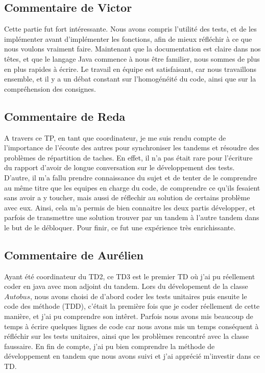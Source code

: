 \documentclass[a4paper,11pts]{article}
\begin{document}
\subsection{Commentaire de Victor}
Cette partie fut fort intéressante. Nous avons compris l'utilité des tests, et de les implémenter avant d'implémenter les fonctions, afin de mieux réfléchir à ce que nous voulons vraiment faire. Maintenant que la documentation est claire dans nos têtes, et que le langage Java commence à nous être familier, nous sommes de plus en plus rapides à écrire. Le travail en équipe est satisfaisant, car nous travaillons ensemble, et il y a un débat constant sur l'homogénéité du code, ainsi que sur la compréhension des consignes.


\subsection{Commentaire de Reda}
A travers ce TP, en tant que coordinateur, je me suis rendu compte de l'importance de l'écoute des autres pour synchroniser les tandems et résoudre des problèmes de répartition de taches. En effet, il n'a pas était rare pour l'écriture du rapport d'avoir de longue conversation sur le développement des tests. D'autre, il m'a fallu prendre connaissance du sujet et de tenter de le comprendre au m\^eme titre que les equipes en charge du code, de comprendre ce qu'ils fesaient sans avoir a y toucher, mais aussi de réflechir au solution de certains problème avec eux. Ainsi, cela m'a permis de bien connaitre les deux partis développer, et parfois de transmettre une solution trouver par un tandem à l'autre tandem dans le but de le débloquer. Pour finir, ce fut une expérience très enrichissante.     



\subsection{Commentaire de Aurélien}

Ayant été coordinateur du TD2, ce TD3 est le premier TD où j'ai pu réellement coder en java avec mon adjoint du tandem. Lors du dévelopement de la classe $Autobus$, nous avons choisi de d'abord coder les tests unitaires puis ensuite le code des méthode (TDD), c'était la première fois que je coder réellement de cette manière, et j'ai pu comprendre son int\^eret. Parfois nous avons mis beaucoup de temps à écrire quelques lignes de code car nous avons mis un temps conséquent à réfléchir sur les tests unitaires, ainsi que les problèmes rencontré avec la classe faussaire. En fin de compte, j'ai pu bien comprendre la méthode de développement en tandem que nous avons suivi et j'ai apprécié m'investir dans ce TD.
\end{document}

